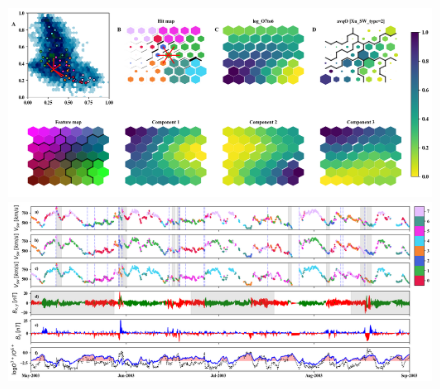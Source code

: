 \documentclass[border=0pt,varwidth=18cm,convert={outext=.jpg,density=300}]{standalone}%
\begin{document}
\pagecolor{white}%
\begin{figure}[h!]
	\begin{center}
		\includegraphics[width=16cm]{Roberts/maps}\\%
		\includegraphics[width=18cm]{Roberts/timeseries}
	\end{center}
\end{figure}
\end{document}

